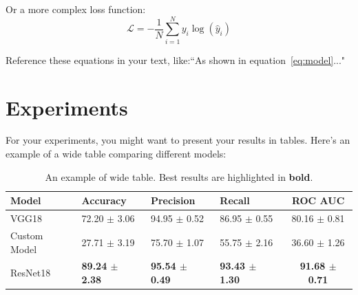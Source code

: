 \documentclass[11pt]{article}
\begin{document}
\begin{multicols}{2}
        \noindent Or a more complex loss function:
        \begin{equation}
            \label{eq:loss}
            \mathcal{L} = -\frac{1}{N}\sum_{i=1}^{N} y_i\log(\hat{y}_i)
        \end{equation}

        \noindent Reference these equations in your text, like:``As shown in equation~\ref{eq:model}..."

        \section{Experiments}


        For your experiments, you might want to present your results in tables. Here's an example of a wide table comparing different models:

        \begin{table}[t]
            \centering
            \setlength{\tabcolsep}{3pt}
            \caption{An example of wide table. Best results are highlighted in \textbf{bold}.}
            \begin{tabularx}{\textwidth}{lYYYc}
                \toprule
                Model & Accuracy & Precision & Recall & ROC AUC\\
                \midrule
                VGG18         &  72.20 $\pm$ 3.06    &   94.95 $\pm$ 0.52     &   86.95 $\pm$ 0.55    &   80.16 $\pm$ 0.81\\
                Custom Model        &  27.71 $\pm$ 3.19    &   75.70 $\pm$ 1.07     &   55.75 $\pm$ 2.16    &   36.60 $\pm$ 1.26\\
                ResNet18    &  \textbf{89.24 $\pm$ 2.38}    &   \textbf{95.54 $\pm$ 0.49}     &   \textbf{93.43 $\pm$ 1.30}    &   \textbf{91.68 $\pm$ 0.71}\\
                \bottomrule
            \end{tabularx}
            \label{tab:Performance}
        \end{table}


\end{multicols}
\end{document}
